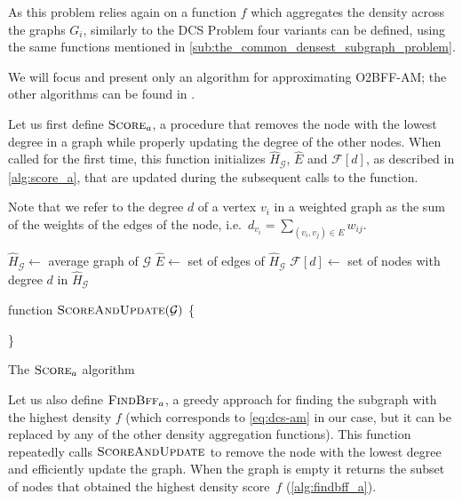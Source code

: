 As this problem relies again on a function $f$ which aggregates the density
across the graphs $G_i$, similarly to the \acrshort{DCS} Problem four variants
can be defined, using the same functions mentioned in
\autoref{sub:the_common_densest_subgraph_problem}.

We will focus and present only an algorithm for approximating
\acrshort{O2BFF}-AM; the other algorithms can be found in
\cite{semertzidis2019finding}.

Let us first define $\textsc{Score}_{a}  $, a procedure that removes the node
with the lowest degree in a graph while properly updating the degree of the
other nodes. When called for the first time, this
function initializes $\hat{H}_{\mathcal{G} }$, $\hat{E}$ and $\mathcal{F}[d] $,
as described in \autoref{alg:score_a}, that are updated during the subsequent
calls to the function.

Note that we refer to the degree $d$ of a vertex $v_{i} $ in a weighted graph as
the sum of the weights of the edges of the node, i.e.\ $ d_{v_i} = \sum^{}_{(v_{i} , v_{j}
	) \in E} w_{ij}  $.

\begin{algorithm}
	\SetAlgoLined
	$\hat{H}_{\mathcal{G} } \leftarrow $ average graph of $\mathcal{G} $ \;
	$\hat{E} \leftarrow $ set of edges of $\hat{H}_{\mathcal{G} }  $ \;
	$\mathcal{F}[d] \leftarrow $ set of nodes with degree
	$d$ in $\hat{H}_{\mathcal{G} }  $\;

	\bigskip

	{function \textnormal{$\textsc{ScoreAndUpdate}( \mathcal{G} )$ \{ }}
	{}

	\}
	\caption{The $\textsc{Score}_{a}  $ algorithm}
	\label{alg:score_a}
\end{algorithm}

Let us also define $\textsc{FindBff}_{a} $, a greedy approach for finding
the subgraph with the highest density $f$ (which corresponds to
\eqref{eq:dcs-am} in our case, but it can be replaced by any of the other
density aggregation functions). This function repeatedly calls
$\textsc{ScoreAndUpdate}$ to remove the node with the lowest degree and
efficiently update
the graph. When the graph is empty it returns the subset of nodes
that obtained the highest density score~$f$ (\autoref{alg:findbff_a}).

